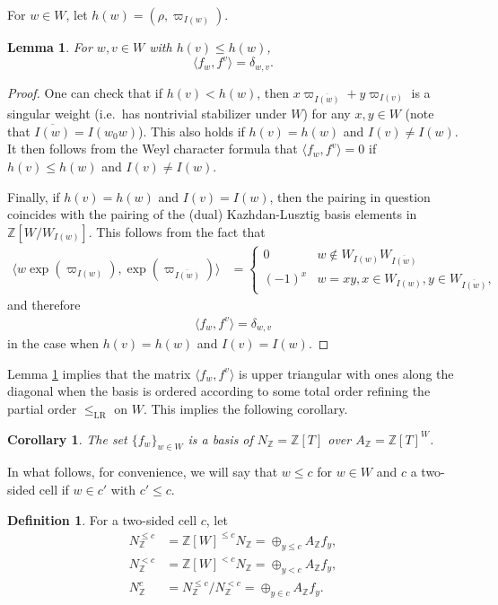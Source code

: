 \documentclass{amsart}
\newtheorem{corollary}[thm]{Corollary}
\newtheorem{lemma}[thm]{Lemma}
\theoremstyle{definition}
\newtheorem{defn}[thm]{Definition}
\begin{document}
For $w \in W$, let $h(w) = (\rho, \varpi_{I(w)})$.
\begin{lemma}\label{lem:gram}
    For $w, v \in W$ with $h(v) \leq h(w)$,
    \[\langle f_w, f^v\rangle = \delta_{w,v}.\]
\end{lemma}
\begin{proof}
    One can check that if $h(v) < h(w)$, then $x\varpi_{\overline{I(w)}} + y\varpi_{I(v)}$ is a singular weight (i.e.\ has nontrivial stabilizer under $W$) for any $x, y \in W$ (note that $\overline{I(w)} = I(w_0w)$). This also holds if $h(v) = h(w)$ and $I(v) \neq I(w)$. It then follows from the Weyl character formula that $\langle f_w,f^v\rangle=0$ if $h(v)\leq h(w)$ and $I(v)\ne I(w)$. 
    
    Finally, if $h(v) = h(w)$ and $I(v) = I(w)$, then the pairing in question coincides with the pairing of the (dual) Kazhdan-Lusztig basis elements in $\mathbb{Z}[W/W_{I(w)}]$. This follows from the fact that
    \begin{align*}
        \langle w\exp(\varpi_{I(w)}), \exp(\varpi_{\overline{I(w)}})\rangle & = \begin{cases}
            0 & w \not\in W_{I(w)}W_{\overline{I(w)}}\\
            (-1)^x & w = xy, x \in W_{I(w)}, y \in W_{\overline{I(w)}},
        \end{cases}
    \end{align*}
    and therefore
    \begin{align*}
        \langle f_w, f^v\rangle = \delta_{w,v}
    \end{align*}
    in the case when $h(v) = h(w)$ and $I(v) = I(w)$.
\end{proof}

Lemma \ref{lem:gram} implies that the matrix $\langle f_w, f^v\rangle$ is upper triangular with ones along the diagonal when the basis is ordered according to some total order refining the partial order $\leq_{\mathrm{LR}}$ on $W$. This implies the following corollary.
\begin{corollary}
    The set $\{f_w\}_{w \in W}$ is a basis of $N_{\mathbb{Z}} = \mathbb{Z}[T]$ over $A_{\mathbb{Z}} = \mathbb{Z}[T]^W$.
\end{corollary}

In what follows, for convenience, we will say that $w \leq c$ for $w \in W$ and $c$ a two-sided cell if $w\in c'$ with $c' \leq c$.

\begin{defn}\label{def:mc}
    For a two-sided cell $c$, let
    \begin{align}
        N^{\leq c}_\mathbb{Z} & = \mathbb{Z}[W]^{\leq c} N_\mathbb{Z} = \oplus_{y \leq c} A_{\mathbb{Z}}f_y,\\
        N^{< c}_\mathbb{Z} & = \mathbb{Z}[W]^{< c} N_\mathbb{Z} = \oplus_{y < c} A_{\mathbb{Z}}f_y,\\
        N^c_\mathbb{Z} & = N^{\leq c}_\mathbb{Z}/N^{< c}_\mathbb{Z} = \oplus_{y \in c} A_{\mathbb{Z}}f_y.
    \end{align}
\end{defn}
\end{document}
